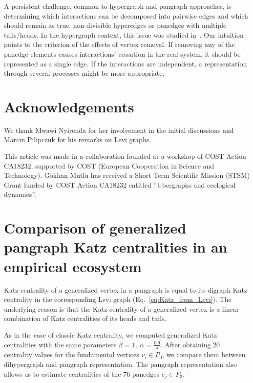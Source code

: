 \documentclass[a4paper,12pt]{article}
\theoremstyle{definition}
\theoremstyle{remark}
\begin{document}
A persistent challenge, common to hypergraph and pangraph approaches, is determining which interactions can be decomposed into pairwise edges and which should remain as true, non-divisible hyperedges or panedges with multiple tails/heads. In the hypergraph context, this issue was studied in~\cite{letten_stouffer_non_additivity}. Our intuition points to the criterion of the effects of vertex removal. If removing any of the panedge elements causes interactions' cessation in the real system, it should be represented as a single edge. If the interactions are independent, a representation through several processes might be more appropriate.

\section{Acknowledgements}

We thank Mwawi Nyirenda for her involvement in the initial discussions and Marcin Pilipczuk for his remarks on Levi graphs.

This article was made in a collaboration founded at a workshop of COST Action CA18232, supported by COST (European Cooperation in Science and Technology).   G\"okhan Mutlu has received a Short
Term Scientific Mission (STSM) Grant funded by COST Action CA18232 entitled ”Ubergraphs and ecological dynamics”.


 
	
\newpage

\appendix

\section{Comparison of generalized pangraph Katz centralities in an empirical ecosystem}
\label{sec:generalized-centrality-analysis}

Katz centrality of a generalized vertex in a pangraph is equal to its digraph Katz centrality in the corresponding Levi graph (Eq.~\ref{eq:Katz_from_Levi}). The underlying reason is that the Katz centrality of a generalized vertex is a linear combination of Katz centralities of its heads and tails.

As in the case of classic Katz centrality, we computed generalized Katz centralities with the same parameters $\beta = 1,\;  \alpha = \frac{0.9}{\lambda}.$ After obtaining 20 centrality values for the fundamental vertices $v_i \in P_0$, we compare them between dihypergraph and pangraph representation. The pangraph representation also allows us to estimate centralities of the 76 panedges $e_j \in P_{3}$.
\end{document}
